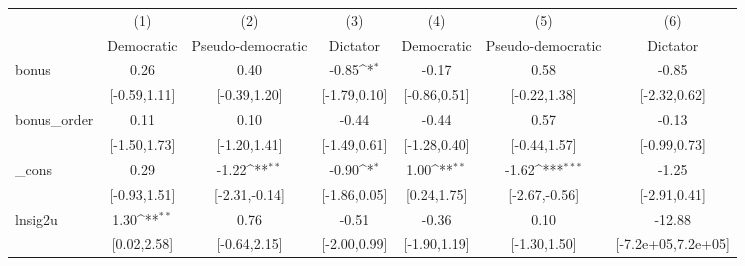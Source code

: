 {
\def\sym#1{\ifmmode^{#1}\else\(^{#1}\)\fi}
\begin{tabular}{l*{6}{c}}
\toprule
            &\multicolumn{1}{c}{(1)}        &\multicolumn{1}{c}{(2)}        &\multicolumn{1}{c}{(3)}        &\multicolumn{1}{c}{(4)}        &\multicolumn{1}{c}{(5)}        &\multicolumn{1}{c}{(6)}        \\
            &\multicolumn{1}{c}{Democratic} &\multicolumn{1}{c}{Pseudo-democratic}&\multicolumn{1}{c}{Dictator}   &\multicolumn{1}{c}{Democratic} &\multicolumn{1}{c}{Pseudo-democratic}&\multicolumn{1}{c}{Dictator}   \\
\midrule
bonus       &                  0.26         &                  0.40         &                 -0.85\sym{*}  &                 -0.17         &                  0.58         &                 -0.85         \\
            &          [-0.59,1.11]         &          [-0.39,1.20]         &          [-1.79,0.10]         &          [-0.86,0.51]         &          [-0.22,1.38]         &          [-2.32,0.62]         \\
\addlinespace
bonus\_order &                  0.11         &                  0.10         &                 -0.44         &                 -0.44         &                  0.57         &                 -0.13         \\
            &          [-1.50,1.73]         &          [-1.20,1.41]         &          [-1.49,0.61]         &          [-1.28,0.40]         &          [-0.44,1.57]         &          [-0.99,0.73]         \\
\addlinespace
\_cons      &                  0.29         &                 -1.22\sym{**} &                 -0.90\sym{*}  &                  1.00\sym{**} &                 -1.62\sym{***}&                 -1.25         \\
            &          [-0.93,1.51]         &         [-2.31,-0.14]         &          [-1.86,0.05]         &           [0.24,1.75]         &         [-2.67,-0.56]         &          [-2.91,0.41]         \\
\addlinespace
lnsig2u     &                  1.30\sym{**} &                  0.76         &                 -0.51         &                 -0.36         &                  0.10         &                -12.88         \\
            &           [0.02,2.58]         &          [-0.64,2.15]         &          [-2.00,0.99]         &          [-1.90,1.19]         &          [-1.30,1.50]         &    [-7.2e+05,7.2e+05]         \\

\end{tabular}}
